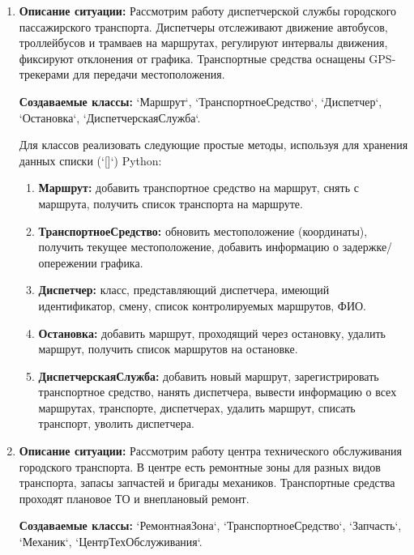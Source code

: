 \begin{enumerate}
\item \textbf{Описание ситуации:} Рассмотрим работу диспетчерской службы 
городского пассажирского транспорта. 
Диспетчеры отслеживают движение автобусов, троллейбусов и трамваев 
на маршрутах, регулируют интервалы движения, фиксируют отклонения от 
графика. Транспортные средства оснащены GPS-трекерами для передачи местоположения.

\textbf{Создаваемые классы:} `Маршрут`, `ТранспортноеСредство`, `Диспетчер`, `Остановка`, `ДиспетчерскаяСлужба`.

Для классов реализовать следующие простые методы, используя для хранения данных списки (`[]`) Python:
\begin{enumerate}
    \item \textbf{Маршрут:} добавить транспортное средство на маршрут, 
    снять с маршрута, получить список транспорта на маршруте.
    \item \textbf{ТранспортноеСредство:} обновить местоположение (координаты), 
    получить текущее местоположение, добавить информацию о задержке/опережении графика.
    \item \textbf{Диспетчер:} класс, представляющий диспетчера, 
    имеющий идентификатор, смену, список контролируемых маршрутов, ФИО.
    \item \textbf{Остановка:} добавить маршрут, проходящий через остановку, 
    удалить маршрут, получить список маршрутов на остановке.
    \item \textbf{ДиспетчерскаяСлужба:} добавить новый маршрут, зарегистрировать транспортное средство, 
    нанять диспетчера, вывести информацию о всех маршрутах, транспорте, 
    диспетчерах, удалить маршрут, списать транспорт, уволить диспетчера.
\end{enumerate}

\item \textbf{Описание ситуации:} Рассмотрим работу центра технического обслуживания 
городского транспорта. В центре есть ремонтные зоны для разных видов 
транспорта, запасы запчастей и бригады механиков. Транспортные средства 
проходят плановое ТО и внеплановый ремонт.

\textbf{Создаваемые классы:} `РемонтнаяЗона`, `ТранспортноеСредство`, `Запчасть`, `Механик`, `ЦентрТехОбслуживания`.


\end{enumerate}
